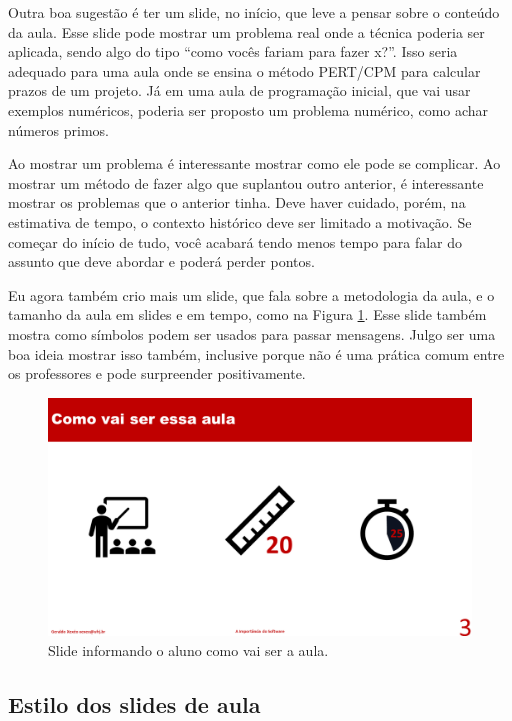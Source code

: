 Outra boa sugestão é ter um slide, no início, que leve a pensar sobre o conteúdo da aula. Esse slide pode mostrar um problema real onde a técnica poderia ser aplicada, sendo algo do tipo ``como vocês fariam para fazer x?''. Isso seria adequado para uma aula onde se ensina o método PERT/CPM para calcular prazos de um projeto. Já em uma aula de programação inicial, que vai usar exemplos numéricos, poderia ser proposto um problema numérico, como achar números primos.

Ao mostrar um problema é interessante mostrar como ele pode se complicar. Ao mostrar um método de fazer algo que suplantou outro anterior, é interessante mostrar os problemas que o anterior tinha. Deve haver cuidado, porém, na estimativa de tempo, o contexto histórico deve ser limitado a motivação. Se começar do início de tudo, você acabará tendo menos tempo para falar do assunto que deve abordar e poderá perder pontos.

Eu agora também crio mais um slide, que fala sobre a metodologia da aula, e o tamanho da aula em slides e em tempo, como na Figura \ref{fig:metodologia}. Esse slide também mostra como símbolos podem ser usados para passar mensagens. Julgo ser  uma boa ideia mostrar isso também, inclusive porque não é uma prática comum entre os professores e pode surpreender positivamente.

\begin{figure}[htb]
    \centering
    \includegraphics[width=\tam\linewidth]{imagens/metodologia.png}
    \caption{Slide informando o aluno como vai ser a aula.}
    \label{fig:metodologia}
\end{figure}




\subsection{Estilo dos slides de aula}

